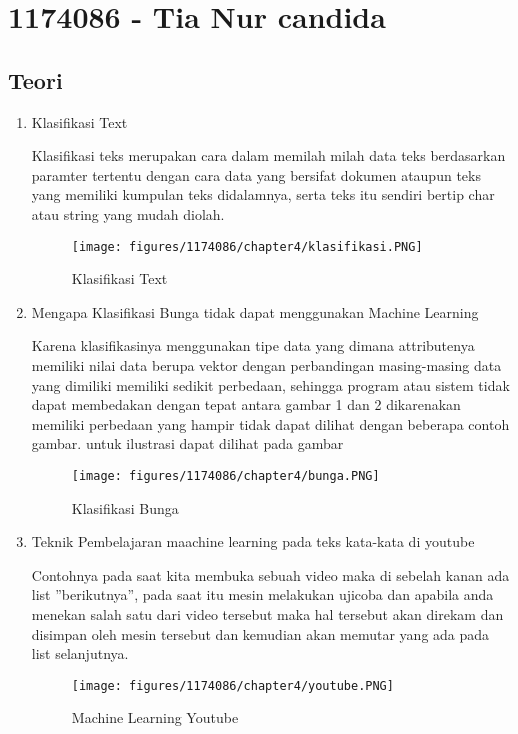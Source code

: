 \section{1174086 - Tia Nur candida}
    \subsection{Teori}
    \begin{enumerate}
        \item Klasifikasi Text
        
        Klasifikasi teks merupakan cara dalam memilah milah data teks berdasarkan paramter tertentu dengan cara data yang bersifat dokumen ataupun teks yang memiliki kumpulan teks didalamnya, serta teks itu sendiri bertip char atau string yang mudah diolah.
        \begin{figure}[H]
            \texttt{[image: figures/1174086/chapter4/klasifikasi.PNG]}
            \centering
            \caption{Klasifikasi Text}
        \end{figure}

        \item Mengapa Klasifikasi Bunga tidak dapat menggunakan Machine Learning
        
		Karena klasifikasinya menggunakan tipe data yang dimana attributenya memiliki nilai data berupa vektor dengan perbandingan masing-masing data yang dimiliki memiliki sedikit perbedaan, sehingga program atau sistem tidak dapat membedakan dengan tepat antara gambar 1 dan 2 dikarenakan memiliki perbedaan yang hampir tidak dapat dilihat dengan beberapa contoh gambar. untuk ilustrasi dapat dilihat pada gambar        
        \begin{figure}[H]
            \texttt{[image: figures/1174086/chapter4/bunga.PNG]}
            \centering
            \caption{Klasifikasi Bunga}
        \end{figure}

        \item Teknik Pembelajaran maachine learning pada teks kata-kata di youtube
        
        Contohnya pada saat kita membuka sebuah video maka di sebelah kanan ada list ”berikutnya”, pada saat itu mesin melakukan ujicoba dan apabila anda menekan salah satu dari video tersebut maka hal tersebut akan direkam dan disimpan oleh mesin tersebut dan kemudian akan memutar yang ada pada list selanjutnya.

        \begin{figure}[H]
            \texttt{[image: figures/1174086/chapter4/youtube.PNG]}
            \centering
            \caption{Machine Learning Youtube}
        \end{figure}


\end{enumerate}
